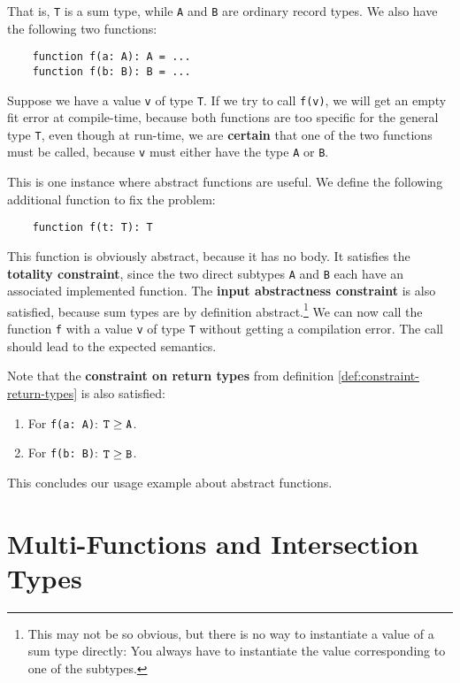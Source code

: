 \noindent That is, \texttt{T} is a sum type, while \texttt{A} and \texttt{B} are ordinary record types. We also have the following two functions:
\begin{lstlisting}
    function f(a: A): A = ...
    function f(b: B): B = ...
\end{lstlisting}

\noindent Suppose we have a value \texttt{v} of type \texttt{T}. If we try to call \texttt{f(v)}, we will get an empty fit error at compile-time, because both functions are too specific for the general type \texttt{T}, even though at run-time, we are \textbf{certain} that one of the two functions must be called, because \texttt{v} must either have the type \texttt{A} or \texttt{B}.

This is one instance where abstract functions are useful. We define the following additional function to fix the problem:
\begin{lstlisting}
    function f(t: T): T
\end{lstlisting}

\noindent This function is obviously abstract, because it has no body. It satisfies the \textbf{totality constraint}, since the two direct subtypes \texttt{A} and \texttt{B} each have an associated implemented function. The \textbf{input abstractness constraint} is also satisfied, because sum types are by definition abstract.\footnote{This may not be so obvious, but there is no way to instantiate a value of a sum type directly: You always have to instantiate the value corresponding to one of the subtypes.} We can now call the function \texttt{f} with a value \texttt{v} of type \texttt{T} without getting a compilation error. The call should lead to the expected semantics. 

Note that the \textbf{constraint on return types} from definition \ref{def:constraint-return-types} is also satisfied:
\begin{enumerate}
	\item For \texttt{f(a: A)}: $\texttt{T} \geq \texttt{A}$.
	\item For \texttt{f(b: B)}: $\texttt{T} \geq \texttt{B}$.
\end{enumerate}

\noindent This concludes our usage example about abstract functions.



\section{Multi-Functions and Intersection Types}

